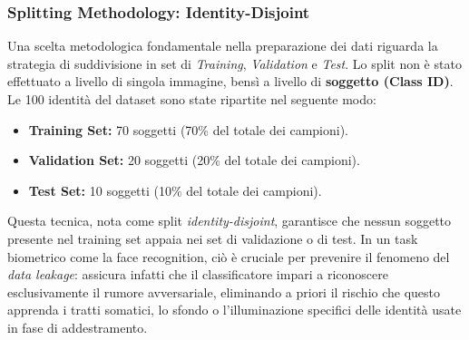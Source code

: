 \documentclass[a4paper, 12pt]{article}
\begin{document}
\begin{itemize}
\end{itemize}

\vspace{10pt}
\subsubsection{Splitting Methodology: Identity-Disjoint}
Una scelta metodologica fondamentale nella preparazione dei dati riguarda la strategia di suddivisione
in set di \textit{Training}, \textit{Validation} e \textit{Test}. Lo split non è stato effettuato a livello di singola 
immagine, bensì a livello di \textbf{soggetto (Class ID)}. Le 100 identità del dataset sono state ripartite nel seguente 
modo:
\begin{itemize}
    \item \textbf{Training Set:} 70 soggetti (70\% del totale dei campioni).
    \item \textbf{Validation Set:} 20 soggetti (20\% del totale dei campioni).
    \item \textbf{Test Set:} 10 soggetti (10\% del totale dei campioni).
\end{itemize}
Questa tecnica, nota come split \textit{identity-disjoint}, 
garantisce che nessun soggetto presente nel training set appaia nei set di validazione o di test. In un task biometrico come la face recognition, 
ciò è cruciale per prevenire il fenomeno del \textit{data leakage}: assicura infatti che il classificatore 
impari a riconoscere esclusivamente il rumore avversariale, eliminando a priori il rischio che questo apprenda i tratti somatici, lo sfondo o l'illuminazione 
specifici delle identità usate in fase di addestramento.
\vspace{10pt}  
\end{document}
